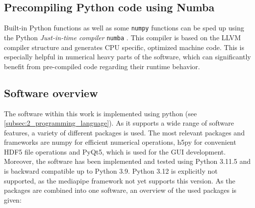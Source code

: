 \subsection{Precompiling Python code using Numba}\label{subsec:3_precompile_numba}
Built-in Python functions as well as some \texttt{numpy} functions can be
sped up using the Python \textit{Just-in-time compiler} \texttt{numba}
\cite{lamNumbaLLVMbasedPython2015}.
This compiler is based on the LLVM compiler structure and generates
\ac{CPU} specific, optimized machine code.
This is especially helpful in numerical heavy parts of the software, which can
significantly benefit from pre-compiled code regarding their runtime behavior.

\subsection{Software overview}\label{subsec:3_versions}
The software within this work is implemented using python (see
\autoref{subsec:2_programming_language}).
As it supports a wide range of software features, a variety of
different packages is used.
The most relevant packages and frameworks are numpy for efficient numerical
operations, h5py for convenient HDF5 file operations and PyQt5, which is used
for the \ac{GUI} development.\\
Moreover, the software has been implemented and tested using Python
3.11.5 and is backward compatible up to Python 3.9.
Python 3.12 is explicitly not supported, as the mediapipe framework not yet
supports this version.
As the packages are combined into one software, an overview of the used
packages is given:

